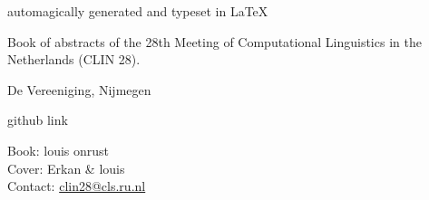 \hspace{0pt}
\vspace{\fill}

automagically generated and typeset in \LaTeX

Book of abstracts of the 28th Meeting of Computational Linguistics in the Netherlands (CLIN 28).

De Vereeniging, Nijmegen

github link

Book: louis onrust \\
Cover: Erkan \& louis \\
Contact: \url{clin28@cls.ru.nl}